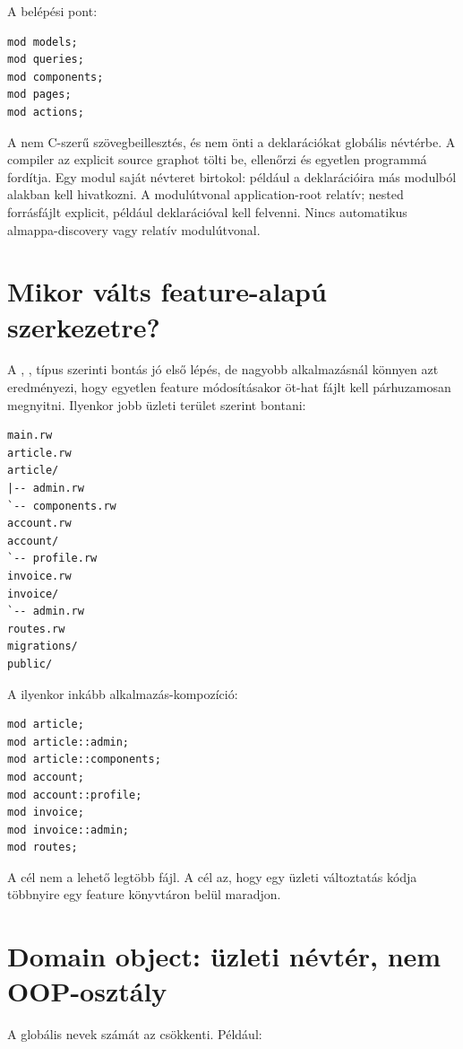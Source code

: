 A belépési pont:

\begin{lstlisting}[language=RWLang]
mod models;
mod queries;
mod components;
mod pages;
mod actions;
\end{lstlisting}

A  nem C-szerű szövegbeillesztés, és nem önti a deklarációkat globális névtérbe. A compiler az explicit source graphot tölti be, ellenőrzi és egyetlen programmá fordítja. Egy modul saját névteret birtokol: például a  deklarációira más modulból  alakban kell hivatkozni. A modulútvonal application-root relatív; nested forrásfájlt explicit, például  deklarációval kell felvenni. Nincs automatikus almappa-discovery vagy relatív  modulútvonal.

\section{Mikor válts feature-alapú szerkezetre?}

A , ,  típus szerinti bontás jó első lépés, de nagyobb alkalmazásnál könnyen azt eredményezi, hogy egyetlen feature módosításakor öt-hat fájlt kell párhuzamosan megnyitni. Ilyenkor jobb üzleti terület szerint bontani:

\begin{lstlisting}
main.rw
article.rw
article/
|-- admin.rw
`-- components.rw
account.rw
account/
`-- profile.rw
invoice.rw
invoice/
`-- admin.rw
routes.rw
migrations/
public/
\end{lstlisting}

A  ilyenkor inkább alkalmazás-kompozíció:

\begin{lstlisting}[language=RWLang]
mod article;
mod article::admin;
mod article::components;
mod account;
mod account::profile;
mod invoice;
mod invoice::admin;
mod routes;
\end{lstlisting}

A cél nem a lehető legtöbb fájl. A cél az, hogy egy üzleti változtatás kódja többnyire egy feature könyvtáron belül maradjon.

\section{Domain object: üzleti névtér, nem OOP-osztály}

A globális nevek számát az  csökkenti. Például:

